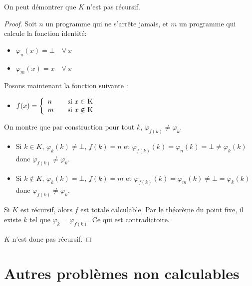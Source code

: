 \begin{myrem}[Démonstration de $K = \{n | \phi_n(n) \neq \bot \}$ grâce au point fixe]
	On peut démontrer que $K$ n'est pas récursif.

    \begin{proof}
	Soit $n$ un programme qui ne s'arrête jamais, et $m$ un programme qui calcule la fonction identité:
		\begin{itemize}
		\item $\varphi_n(x) = \bot \quad \forall \ x$
		\item $\varphi_m(x) = x \quad \forall  \ x$
	\end{itemize}
	Posons maintenant la  fonction suivante :
	\begin{itemize}

		\item $ f(x) = \left\{
		\begin{array}{l l}
			n & \quad \text{si $x\in$ K}\\
    		m & \quad \text{si $x\notin$ K}
		\end{array} \right.$
	\end{itemize}

    On montre que par construction pour tout $k$, $\varphi_{f(k)} \neq \varphi_k$.
    \begin{itemize}
      \item Si $k \in K$, $\varphi_k(k) \neq \bot$, $f(k) = n$ et
        $\varphi_{f(k)}(k) = \varphi_n(k) = \bot \neq \varphi_k(k)$ donc $\varphi_{f(k)} \neq \varphi_k$.
      \item Si $k \notin K$, $\varphi_k(k) = \bot$, $f(k) = m$ et
        $\varphi_{f(k)}(k) = \varphi_m(k) \neq \bot = \varphi_k(k)$ donc $\varphi_{f(k)} \neq \varphi_k$.
    \end{itemize}
    Si $K$ est récursif, alors $f$ est totale calculable.
	Par le théorème du point fixe, il existe $k$ tel que $\varphi_k = \varphi_{f(k)}$.
    Ce qui est contradictoire.

    $K$ n'est donc pas récursif.
  \end{proof}

\end{myrem}

\section{Autres problèmes non calculables}
\label{sec:autres_probl_mes_non_calculable}

